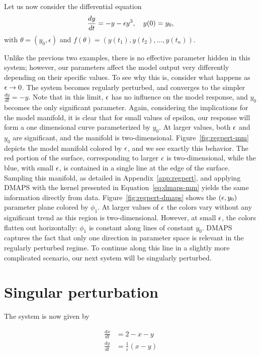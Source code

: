 Let us now consider the differential equation
%
\begin{equation}
 \frac{dy}{dt} = - y -\epsilon y^3,
\quad
 y(0) = y_0 ,
\label{1D-model-regpert}
\end{equation}
%
with $\theta = (y_0, \epsilon)$ and $f(\theta) = \left(y(t_1), y(t_2), \dots,
  y(t_n) \right)$.

Unlike the previous two examples, there is no effective parameter
hidden in this system; however, our parameters affect the model output
very differently depending on their specific values. To see why this
is, consider what happens as $\epsilon \rightarrow 0$. The system becomes
regularly perturbed, and converges to the simpler $\frac{dy}{dt} = -y$. Note
that in this limit, $\epsilon$ has no influence on the model response, and
$y_0$ becomes the only significant parameter. Again, considering the
implications for the model manifold, it is clear that for small values
of epsilon, our response will form a one dimensional curve
parameterized by $y_0$. At larger values, both $\epsilon$ and $y_0$ are
significant, and the manifold is
two-dimensional. Figure~\ref{fig:regpert-mm} depicts the model
manifold colored by $\epsilon$, and we see exactly this behavior. The red
portion of the surface, corresponding to larger $\epsilon$ is
two-dimensional, while the blue, with small $\epsilon$, is contained in a
single line at the edge of the surface. Sampling this manifold, as
detailed in Appendix~\ref{app:regpert}, and applying DMAPS with the
kernel presented in Equation~\ref{eq:dmaps-mm} yields the same
information directly from data. Figure~\ref{fig:regpert-dmaps} shows
the $(\epsilon, y_0)$ parameter plane colored by $\phi_1$. At larger
values of $\epsilon$ the colors vary without any significant trend as this
region is two-dimensional. However, at small $\epsilon$, the colors
flatten out horizontally: $\phi_1$ is constant along lines of constant
$y_0$. DMAPS captures the fact that only one direction in parameter
space is relevant in the regularly perturbed regime. To continue along
this line in a slightly more complicated scenario, our next system
will be singularly perturbed.


\section{Singular perturbation}

The system is now given by

\begin{align}
   \frac{dx}{dt}&=2-x-y\\
   \frac{dy}{dt}&= \frac{1}{\epsilon}(x-y)
\end{align}    

